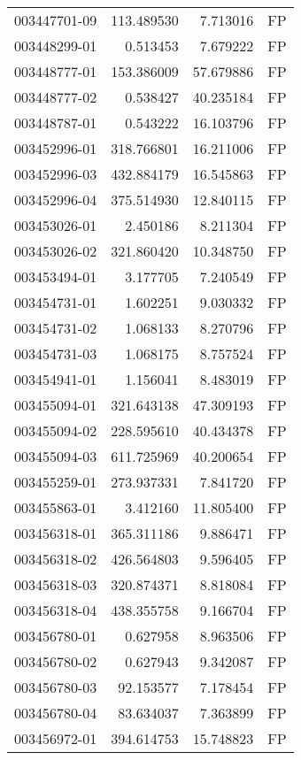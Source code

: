 \begin{tabular}{lrrl}
003447701-09 &  113.489530 &     7.713016 &   FP \\
003448299-01 &    0.513453 &     7.679222 &   FP \\
003448777-01 &  153.386009 &    57.679886 &   FP \\
003448777-02 &    0.538427 &    40.235184 &   FP \\
003448787-01 &    0.543222 &    16.103796 &   FP \\
003452996-01 &  318.766801 &    16.211006 &   FP \\
003452996-03 &  432.884179 &    16.545863 &   FP \\
003452996-04 &  375.514930 &    12.840115 &   FP \\
003453026-01 &    2.450186 &     8.211304 &   FP \\
003453026-02 &  321.860420 &    10.348750 &   FP \\
003453494-01 &    3.177705 &     7.240549 &   FP \\
003454731-01 &    1.602251 &     9.030332 &   FP \\
003454731-02 &    1.068133 &     8.270796 &   FP \\
003454731-03 &    1.068175 &     8.757524 &   FP \\
003454941-01 &    1.156041 &     8.483019 &   FP \\
003455094-01 &  321.643138 &    47.309193 &   FP \\
003455094-02 &  228.595610 &    40.434378 &   FP \\
003455094-03 &  611.725969 &    40.200654 &   FP \\
003455259-01 &  273.937331 &     7.841720 &   FP \\
003455863-01 &    3.412160 &    11.805400 &   FP \\
003456318-01 &  365.311186 &     9.886471 &   FP \\
003456318-02 &  426.564803 &     9.596405 &   FP \\
003456318-03 &  320.874371 &     8.818084 &   FP \\
003456318-04 &  438.355758 &     9.166704 &   FP \\
003456780-01 &    0.627958 &     8.963506 &   FP \\
003456780-02 &    0.627943 &     9.342087 &   FP \\
003456780-03 &   92.153577 &     7.178454 &   FP \\
003456780-04 &   83.634037 &     7.363899 &   FP \\
003456972-01 &  394.614753 &    15.748823 &   FP \\

\end{tabular}
